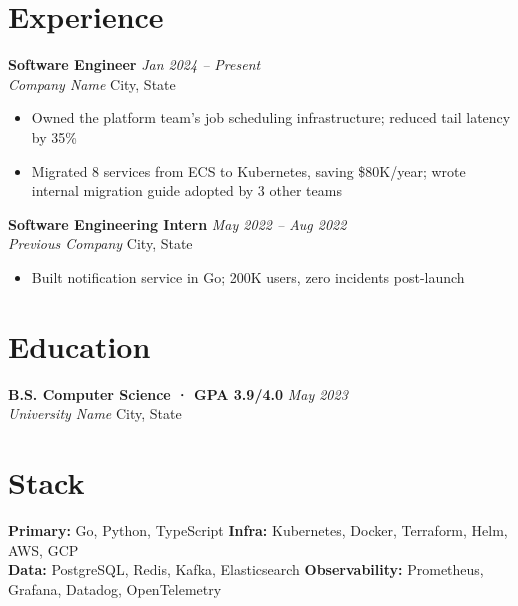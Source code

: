 \documentclass[10.5pt, letterpaper]{article}
\newcommand{\role}[4]{%
  \noindent\textbf{#1} \hfill {\small\textit{#2}}\\
  \textit{\small #3} \hfill {\small #4}
}
\begin{document}
\section{Experience}

\role{Software Engineer}{Jan 2024 -- Present}{Company Name}{City, State}
\begin{itemize}[leftmargin=*, noitemsep, topsep=3pt]
  \item Owned the platform team's job scheduling infrastructure; reduced tail latency by 35\%
  \item Migrated 8 services from ECS to Kubernetes, saving \$80K/year; wrote internal migration guide adopted by 3 other teams
\end{itemize}

\vspace{5pt}
\role{Software Engineering Intern}{May 2022 -- Aug 2022}{Previous Company}{City, State}
\begin{itemize}[leftmargin=*, noitemsep, topsep=3pt]
  \item Built notification service in Go; 200K users, zero incidents post-launch
\end{itemize}

\section{Education}

\role{B.S. Computer Science · GPA 3.9/4.0}{May 2023}{University Name}{City, State}

\section{Stack}

\noindent\textbf{Primary:} Go, Python, TypeScript \quad
\textbf{Infra:} Kubernetes, Docker, Terraform, Helm, AWS, GCP \\
\textbf{Data:} PostgreSQL, Redis, Kafka, Elasticsearch \quad
\textbf{Observability:} Prometheus, Grafana, Datadog, OpenTelemetry
\end{document}
